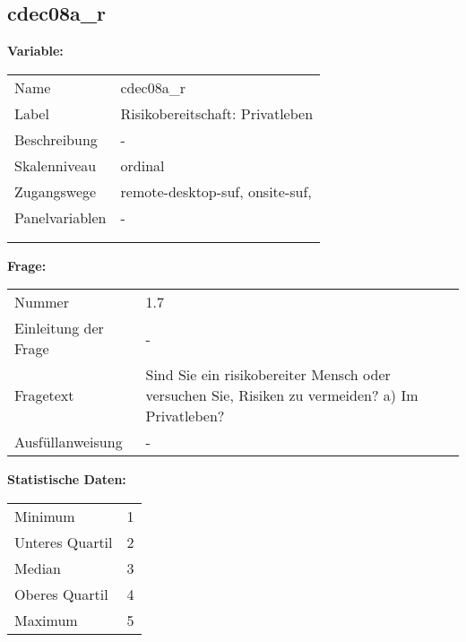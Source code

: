 	
	
	\subsection{cdec08a\_r}
	\label{subSection:cdec08a_r}

	\noindent\textbf{Variable:}\\
		\begin{tabular}{lL{11.3cm}}
			\label{tableVariable:cdec08a_r}
			Name & cdec08a\_r \\
			Label & Risikobereitschaft: Privatleben \\
			Beschreibung & - \\
			Skalenniveau & ordinal \\
			Zugangswege &
				remote-desktop-suf,
				onsite-suf,
 \\
			Panelvariablen & -
			 \\
			 \\
 \\
		\end{tabular}

		\vspace*{1 cm}
		\noindent\textbf{Frage:}\\
		\begin{tabular}{lL{11.3cm}}
			\label{tableQuestion:cdec08a_r}
			Nummer & 1.7 \\
			Einleitung der Frage & - \\
			Fragetext & Sind Sie ein risikobereiter Mensch oder versuchen Sie, Risiken zu vermeiden?
a) Im Privatleben? \\
			Ausfüllanweisung & - \\
		\end{tabular}


		\vspace*{1 cm}
		\noindent\textbf{Statistische Daten:}\\
			\begin{tabular}{ll}
				\label{tableStatistics:cdec08a_r}
					Minimum & 1 \\
					Unteres Quartil & 2 \\
					Median & 3 \\
					Oberes Quartil & 4 \\
					Maximum & 5 \\
			\end{tabular}



